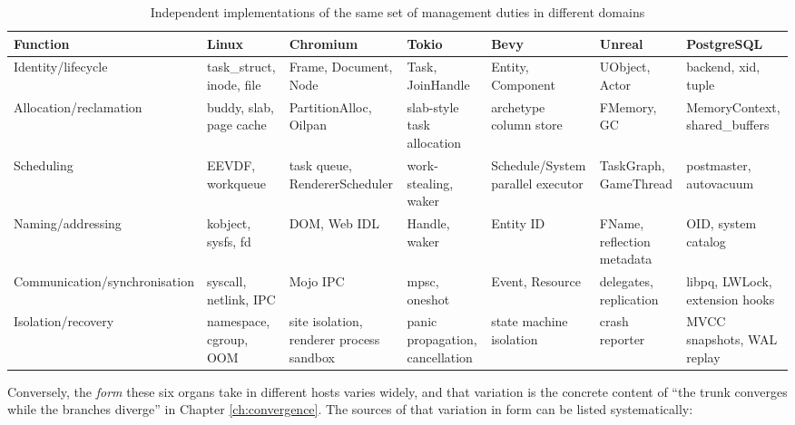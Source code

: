\begin{table}[htbp]
\centering
\scriptsize
\setlength{\tabcolsep}{3pt}
\caption{Independent implementations of the same set of management duties in different domains}\label{tab:organs}
\begin{tabular}{L{1.4cm}L{2.1cm}L{2.15cm}L{1.95cm}L{1.9cm}L{2.15cm}L{2.15cm}}
\toprule
\textbf{Function} & \textbf{Linux} & \textbf{Chromium} & \textbf{Tokio} & \textbf{Bevy}
& \textbf{Unreal} & \textbf{PostgreSQL} \\
\midrule
Identity/\newline lifecycle & task\_struct, inode, file & Frame, Document, Node &
Task, JoinHandle & Entity, Component & UObject, Actor & backend, xid, tuple \\
Allocation/\newline reclamation & buddy, slab, page cache & PartitionAlloc, Oilpan &
slab-style task allocation & archetype column store & FMemory, GC &
MemoryContext, shared\_buffers \\
Scheduling & EEVDF, workqueue & task queue, RendererScheduler &
work-stealing, waker & Schedule/System parallel executor & TaskGraph, GameThread &
postmaster, autovacuum \\
Naming/\newline addressing & kobject, sysfs, fd & DOM, Web IDL & Handle, waker &
Entity ID & FName, reflection metadata & OID, system catalog \\
Communi\-cation/\newline synchroni\-sation & syscall, netlink, IPC & Mojo IPC &
mpsc, oneshot &
Event, Resource & delegates, replication & libpq, LWLock, extension hooks \\
Isolation/\newline recovery & namespace, cgroup, OOM & site isolation, renderer process sandbox &
panic propagation, cancellation & state machine isolation & crash reporter &
MVCC snapshots, WAL replay \\
\bottomrule
\end{tabular}
\end{table}

Conversely, the \emph{form} these six organs take in different hosts varies widely, and that
variation is the concrete content of ``the trunk converges while the branches diverge'' in
Chapter \ref{ch:convergence}. The sources of that variation in form can be listed
systematically:

